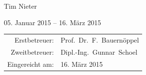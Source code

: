 \begin{titlepage}
\begin{large}
\begin{center}
			\begin{Large}
			Tim Nieter\\
			\end{Large}
			
			\vspace{.5cm}
			
			{05. Januar 2015} -- {16. März 2015}
			
			\vfill
			
			
			\vfill
			
			\begin{tabular}{rl}
			 Erstbetreuer:   & Prof.\ Dr.\ F.\ Bauernöppel\\
			 Zweitbetreuer:   & Dipl.-Ing.\ Gunnar\ Schoel\\
			 Eingereicht am:   & {16. März 2015}
			\end{tabular}
		\end{center}
	\end{large}
\end{titlepage}


%